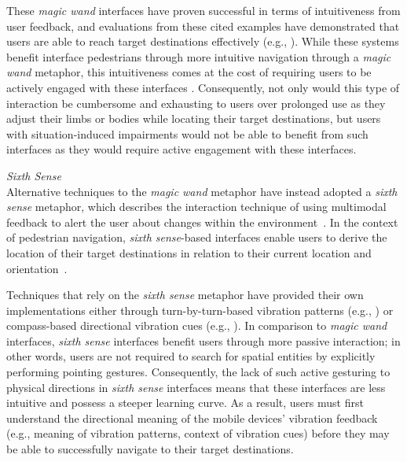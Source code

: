 \documentclass{sigchi}
\begin{document}
These \textit{magic wand} interfaces have proven successful in terms of intuitiveness from user feedback, and evaluations from these cited examples have demonstrated that users are able to reach target destinations effectively (e.g., \cite{2010_Magnusson_HAID, 2010_Robinson_MobileHCI, 2010_Williamson_CHI}).  While these systems benefit interface pedestrians through more intuitive navigation through a \textit{magic wand} metaphor, this intuitiveness comes at the cost of requiring users to be actively engaged with these interfaces \cite{2010_Robinson_MobileHCI}.  Consequently, not only would this type of interaction be cumbersome and exhausting to users over prolonged use as they adjust their limbs or bodies while locating their target destinations, but users with situation-induced impairments would not be able to benefit from such interfaces as they would require active engagement with these interfaces.

\textit{Sixth Sense}\\
Alternative techniques to the \textit{magic wand} metaphor have instead adopted a \textit{sixth sense} metaphor, which describes the interaction technique of using multimodal feedback to alert the user about changes within the environment~\cite{2011_Frohlich_CommunACM}.  In the context of pedestrian navigation, \textit{sixth sense}-based interfaces enable users to derive the location of their target destinations in relation to their current location and orientation~\cite{2012_Pielot_CHI}.

Techniques that rely on the \textit{sixth sense} metaphor have provided their own implementations either through turn-by-turn-based vibration patterns (e.g., \cite{2008_Lin_OZCHI, 2012_Raisamo_EuroHaptics}) or compass-based directional vibration cues (e.g., \cite{2012_Cummings_CHINZ, 2011_Pielot_ICMI, 2011_Pielot_INTERACT, 2011_Rumelin_UIST, 2012_Szymczak_MobileHCI}).  In comparison to \textit{magic wand} interfaces, \textit{sixth sense} interfaces benefit users through more passive interaction; in other words, users are not required to search for spatial entities by explicitly performing pointing gestures.  Consequently, the lack of such active gesturing to physical directions in \textit{sixth sense} interfaces means that these interfaces are less intuitive and possess a steeper learning curve.  As a result, users must first understand the directional meaning of the mobile devices' vibration feedback (e.g., meaning of vibration patterns, context of vibration cues) before they may be able to successfully navigate to their target destinations.
\end{document}
